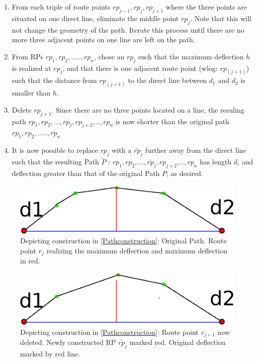 \begin{enumerate}
	\item{From each triple of route points $rp_{j-1},rp_{j},rp_{j+1}$  where the three points are situated on
	      one direct line, eliminate the middle point $rp_{j}$. Note that this will not change the geometry of the path.
	      Iterate this process until there are no more three adjacent points on one line are left on the path.
	      }

	\item{From RPs $rp_1,rp_2,.....,rp_n$, chose an $rp_j$ such that the maximum deflection $h$ is realized at 
	      $rp_j$, and that there is one adjacent route point (wlog: $rp_{(j+1)}$}) such that
 	      the distance from $rp_{(j+1)}$ to the direct line between $d_1$ and $d_2$ is smaller than $h$.
	
	\item{Delete $rp_{j+1}$. Since there are no three points located on a line, the resuling path 
               $rp_1,rp_2,...,rp_j,rp_{j+2},..,rp_n$ is now shorter than the original path $rp_1,rp_2,.....,rp_n$
	      }

        \item{ It is now possible to replace $rp_j$ with a $\tilde{rp_j}$ further away from the direct line such that
	       the resulting Path  $\tilde{P}$ : $rp_1,rp_2,...,\tilde{rp_j},rp_{j+2},..,rp_n$ has length $d$,
	       and deflection greater than that of the original Path $P$, as desired. 	
	      }
\end{enumerate}

 
\begin{figure}[h]
\includegraphics[scale=0.5]{images/03.02.deflection.eps}
\caption{Depicting construction in \ref{Pathconstruction}: 
	Original Path. Route point $r_j$ realizing the maximum deflection and maximum deflection
	in red.
	}
\end{figure}

\begin{figure}[h]
\includegraphics[scale=0.5]{images/03.03.deflection.eps}
\caption{
	Depicting construction in \ref{Pathconstruction}: 
	Route point $r_{j+1}$ now deleted. 
	Newly constructed RP $\tilde{rp_j}$ marked red.
	Original deflection marked by red line. 
	}
\end{figure}


